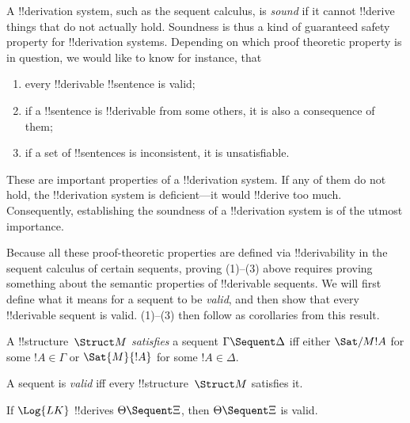 \documentclass[../../../include/open-logic-section]{subfiles}
\begin{document}

\begin{explain}
A !!{derivation} system, such as the sequent calculus, is \emph{sound}
if it cannot !!{derive} things that do not actually hold.  Soundness is
thus a kind of guaranteed safety property for !!{derivation} systems.
Depending on which proof theoretic property is in question, we would
like to know for instance, that
\begin{enumerate}
\item every !!{derivable} !!{sentence} is valid;
\item if a !!{sentence} is !!{derivable} from some others, it is also a
  consequence of them;
\item if a set of !!{sentence}s is inconsistent, it is unsatisfiable.
\end{enumerate}
These are important properties of a !!{derivation} system.  If any of them do
not hold, the !!{derivation} system is deficient---it would !!{derive} too much.
Consequently, establishing the soundness of a !!{derivation} system is of the
utmost importance.

Because all these proof-theoretic properties are
defined via !!{derivability} in the sequent calculus of certain sequents,
proving (1)--(3) above requires proving something about the semantic
properties of !!{derivable} sequents.  We will first define what it means
for a sequent to be \emph{valid}, and then show that every !!{derivable}
sequent is valid.  (1)--(3) then follow as corollaries from this
result.
\end{explain}

\begin{defn}
A !!{structure}~$\Struct M$ \emph{satisfies} a sequent $\Gamma
\Sequent \Delta$ iff either $\Sat/{M}{!A}$ for some $!A
\in \Gamma$ or $\Sat{M}{!A}$ for some $!A \in \Delta$.

A sequent is \emph{valid} iff every !!{structure}~$\Struct M$
satisfies it.
\end{defn}

\begin{thm}[Soundness]
 If $\Log{LK}$ !!{derive}s $\Theta \Sequent
\Xi$, then $\Theta \Sequent \Xi$ is valid.
\end{thm}
\end{document}

